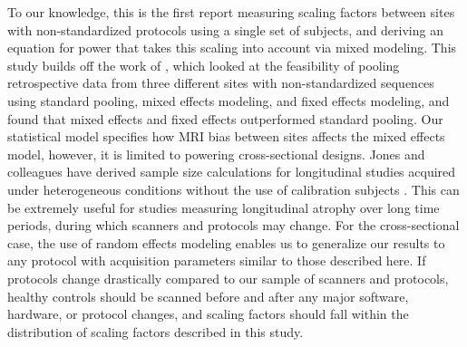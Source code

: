 To our knowledge, this is the first report measuring scaling factors between sites with non-standardized protocols using a single set of subjects, and deriving an equation for power that takes this scaling into account via mixed modeling. This study builds off the work of \cite{fennema2007feasibility}, which looked at the feasibility of pooling retrospective data from three different sites with non-standardized sequences using standard pooling, mixed effects modeling, and fixed effects modeling, and found that mixed effects and fixed effects outperformed standard pooling. Our statistical model specifies how MRI bias between sites affects the mixed effects model, however, it is limited to powering cross-sectional designs. Jones and colleagues have derived sample size calculations for longitudinal studies acquired under heterogeneous conditions without the use of calibration subjects \cite{jones2013quantification}. This can be extremely useful for studies measuring longitudinal atrophy over long time periods, during which scanners and protocols may change. For the cross-sectional case, the use of random effects modeling enables us to generalize our results to any protocol with acquisition parameters similar to those described here. If protocols change drastically compared to our sample of scanners and protocols, healthy controls should be scanned before and after any major software, hardware, or protocol changes, and scaling factors should fall within the distribution of scaling factors described in this study.